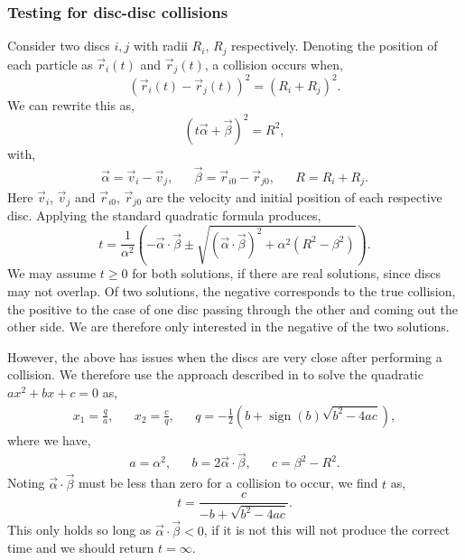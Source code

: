 \documentclass{article}
\DeclareMathOperator{\sign}{sign}
\begin{document}
\subsubsection{Testing for disc-disc collisions}
Consider two discs $i, j$ with radii $R_i$, $R_j$ respectively. Denoting the position of each particle as $\vec{r}_i(t)$ and $\vec{r}_j(t)$, a collision occurs when,
\begin{equation}
    (\vec{r}_i(t) - \vec{r}_j(t))^2 = (R_i + R_j)^2.
\end{equation}
We can rewrite this as,
\begin{equation}
    (t\vec{\alpha} + \vec{\beta})^2 = R^2,
\end{equation}
with,
\begin{align}
    \vec{\alpha}
    =
    \vec{v}_i - \vec{v}_j,
    &&
    \vec{\beta}
    =
    \vec{r}_{i0} - \vec{r}_{j0},
    &&
    R = R_i + R_j.
\end{align}
Here $\vec{v}_i$, $\vec{v}_j$ and $\vec{r}_{i0}$, $\vec{r}_{j0}$ are the velocity and initial position of each respective disc. Applying the standard quadratic formula produces,
\begin{equation}
    t
    =
    \frac{1}{\alpha^2}
    \left(
        -\vec{\alpha} \cdot \vec{\beta}
        \pm
        \sqrt{(\vec{\alpha} \cdot \vec{\beta})^2 + \alpha^2(R^2 - \beta^2)}
    \right).
\end{equation}
We may assume $t \geq 0$ for both solutions, if there are real solutions, since discs may not overlap. Of two solutions, the negative corresponds to the true collision, the positive to the case of one disc passing through the other and coming out the other side. We are therefore only interested in the negative of the two solutions.

However, the above has issues when the discs are very close after performing a collision. We therefore use the approach described in \cite{numerical-recipes} to solve the quadratic $ax^2 + bx + c = 0$ as,
\begin{align}
    x_1 = \frac{q}{a}, 
    &&
    x_2 = \frac{c}{q},
    &&
    q = - \frac{1}{2}\left(
        b
        +
        \sign(b)
        \sqrt{b^2 - 4ac}
    \right),
\end{align}
where we have,
\begin{align}
    a
    =
    \alpha^2,
    &&
    b
    =
    2 \vec{\alpha} \cdot \vec{\beta},
    &&
    c
    =
    \beta^2 - R^2.
\end{align}
Noting $\vec{\alpha} \cdot \vec{\beta}$ must be less than zero for a collision to occur, we find $t$ as,
\begin{equation}
    t
    =
    \frac{c}{-b + \sqrt{b^2-4ac}}.
\end{equation}
This only holds so long as $\vec{\alpha} \cdot \vec{\beta} < 0$, if it is not this will not produce the correct time and we should return $t = \infty$.
\end{document}
